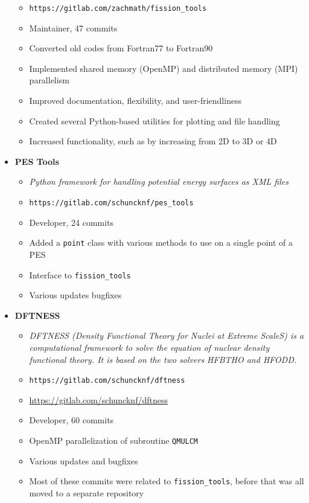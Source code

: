 \begin{itemize}
\begin{itemize}
		\item \verb|https://gitlab.com/zachmath/fission_tools|
		\item Maintainer, 47 commits
		\item Converted old codes from Fortran77 to Fortran90
		\item Implemented shared memory (OpenMP) and distributed memory (MPI) parallelism
		\item Improved documentation, flexibility, and user-friendliness
		\item Created several Python-based utilities for plotting and file handling
		\item Increased functionality, such as by increasing from 2D to 3D or 4D
	\end{itemize}
	\item \textbf{PES Tools}
	\begin{itemize}
		\item \textit{Python framework for handling potential energy surfaces as XML files}
		\item \verb|https://gitlab.com/schuncknf/pes_tools|
		\item Developer, 24 commits
		\item Added a \verb|point| class with various methods to use on a single point of a PES
		\item Interface to \verb|fission_tools|
		\item Various updates bugfixes
	\end{itemize}
	\item \textbf{DFTNESS}
	\begin{itemize}
		\item \textit{DFTNESS (Density Functional Theory for Nuclei at Extreme ScaleS) is a computational framework to solve the equation of nuclear density functional theory. It is based on the two solvers HFBTHO and HFODD.}
		\item \verb|https://gitlab.com/schuncknf/dftness|
		\item \href{https://gitlab.com/schuncknf/dftness}{https://gitlab.com/schuncknf/dftness}
		\item Developer, 60 commits
		\item OpenMP parallelization of subroutine \verb|QMULCM|
		\item Various updates and bugfixes
		\item Most of these commits were related to \verb|fission_tools|, before that was all moved to a separate repository
	\end{itemize}
\end{itemize}